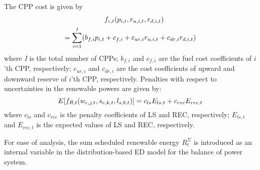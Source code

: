 The CPP cost is given by
\begin{equation} \label{DB_2}
\begin{aligned}
& f_{c,t}(p_{i,t},r_{u,i,t},r_{d,i,t})\\
=\sum _{{\it i}=1}^{{\it I}}(b_{f,i}p_{i,t} & +c_{f,i}+c_{ur,i}r_{u,i,t}+c_{dr,i}r_{d,i,t})
\end{aligned}
\end{equation}
where {\it I} is the total number of CPPs; $b_{f,i}$ and $c_{f,i}$ are the fuel cost coefficients of $i$'th CPP, respectively; $c_{ur,i}$ and $c_{dr,i}$ are the cost coefficients of upward and downward reserve of $i$'th CPP, respectively.
Penalties with respect to uncertainties in the renewable powers are given by:
\begin{equation} \label{DB_3}
E[f_{R,t}(w_{c,j,t},s_{c,k,t},l_{s,b,t})]=c_{ls}E_{ls,t}+c_{rec}E_{rec,t}\\
\end{equation}
where $c_{ls}$ and $c_{rec}$ is the penalty coefficients of LS and REC, respectively; $E_{ls,t}$ and $E_{rec,t}$ is the expected values of LS and REC, respectively.

For ease of analysis, the sum scheduled renewable energy $R_{t}^{\Sigma}$ is introduced as an internal variable in the distribution-based ED model for the balance of power system.


